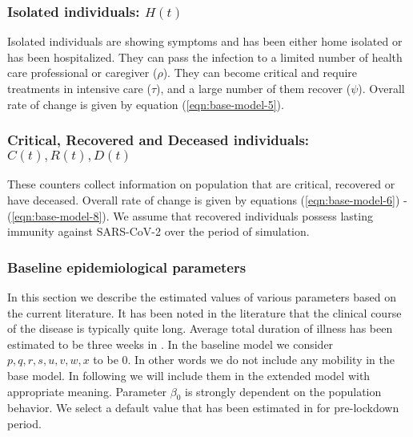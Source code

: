 \documentclass[authoryear,preprint]{elsarticle}
\begin{document}
\subsubsection{Isolated individuals: $H(t)$}
Isolated individuals are showing symptoms and has been either home isolated or has been hospitalized. They can pass the infection to a limited number of health care professional or caregiver ($\rho$). They can become critical and require treatments in intensive care ($\tau$), and a large number of them recover ($\psi$). Overall rate of change is given by equation (\ref{eqn:base-model-5}).

\subsubsection{Critical, Recovered and Deceased individuals: $C(t), R(t), D(t)$}
These counters collect information on population that are critical, recovered or have deceased. Overall rate of change is given by equations (\ref{eqn:base-model-6}) -  (\ref{eqn:base-model-8}). We assume that recovered individuals possess lasting immunity against SARS-CoV-2 over the period of simulation.

\subsubsection{Baseline epidemiological parameters}
In this section we describe the estimated values of various parameters based on the current literature. It has been noted in the literature that the clinical course of the disease is typically quite long. Average total duration of illness has been estimated to be three weeks in \cite{Zhou2020}. In the baseline model we consider $p, q, r, s, u, v, w, x$ to be 0. In other words we do  not include any mobility in the base model. In following we will include them in the extended model with appropriate meaning. Parameter $\beta_0$ is strongly dependent on the population behavior. We select a default value that has been estimated in \cite{Shen2020.01.23.916726} for pre-lockdown period.

\cite{Long2020}
\end{document}

